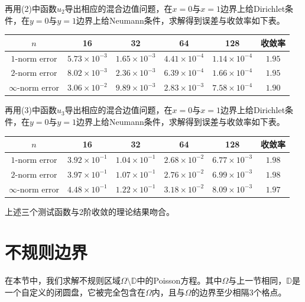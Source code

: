 \documentclass[lang=cn,11pt,a4paper]{elegantpaper}
\begin{document}
再用(2)中函数$u_2$导出相应的混合边值问题，在$x=0$与$x=1$边界上给Dirichlet条件，在$y=0$与$y=1$边界上给Neumann条件，求解得到误差与收敛率如下表。

\begin{table}[H]
  \centering
  \begin{tabular}{c|cccc|c}
  \textbf{$n$}        & 16                   & 32                   & 64                   & 128                  & 收敛率 \\ \hline
  $1$-norm error      & $5.73\times 10^{-3}$ & $1.65\times 10^{-3}$ & $4.41\times 10^{-4}$ & $1.14\times 10^{-4}$ & $1.95$\\
  $2$-norm error      & $8.02\times 10^{-3}$ & $2.36\times 10^{-3}$ & $6.39\times 10^{-4}$ & $1.66\times 10^{-4}$ & $1.95$\\
  $\infty$-norm error & $3.06\times 10^{-2}$ & $9.89\times 10^{-3}$ & $2.83\times 10^{-3}$ & $7.58\times 10^{-4}$ & $1.90$
  \end{tabular}
\end{table}

再用(3)中函数$u_3$导出相应的混合边值问题，在$x=0$与$x=1$边界上给Dirichlet条件，在$y=0$与$y=1$边界上给Neumann条件，求解得到误差与收敛率如下表。

\begin{table}[H]
  \centering
  \begin{tabular}{c|cccc|c}
  \textbf{$n$}        & 16                   & 32                   & 64                   & 128                  & 收敛率 \\ \hline
  $1$-norm error      & $3.92\times 10^{-1}$ & $1.04\times 10^{-1}$ & $2.68\times 10^{-2}$ & $6.77\times 10^{-3}$ & $1.98$\\
  $2$-norm error      & $3.97\times 10^{-1}$ & $1.07\times 10^{-1}$ & $2.76\times 10^{-2}$ & $6.99\times 10^{-3}$ & $1.98$\\
  $\infty$-norm error & $4.48\times 10^{-1}$ & $1.22\times 10^{-1}$ & $3.18\times 10^{-2}$ & $8.09\times 10^{-3}$ & $1.97$
  \end{tabular}
\end{table}

上述三个测试函数与2阶收敛的理论结果吻合。

\section{不规则边界}

在本节中，我们求解不规则区域$\Omega\setminus \mathbb{D}$中的Poisson方程。其中$\Omega$与上一节相同，$\mathbb{D}$是一个自定义的闭圆盘，它被完全包含在$\Omega$内，且与$\Omega$的边界至少相隔$3$个格点。
\end{document}
